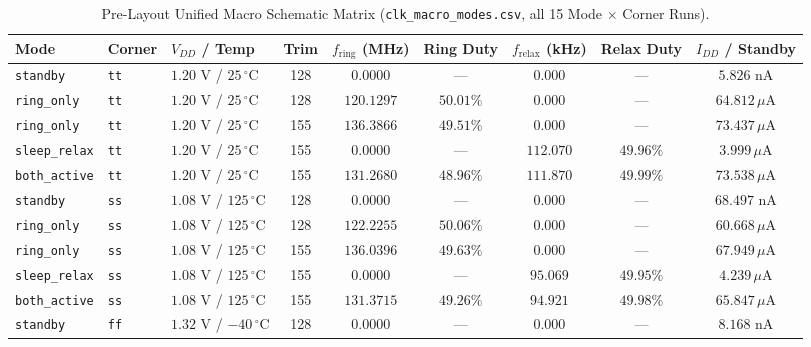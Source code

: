 \documentclass[10pt,a4paper]{article}
\begin{document}
\begin{table}[H]
\centering
\caption{Pre-Layout Unified Macro Schematic Matrix (\texttt{clk\_macro\_modes.csv}, all 15 Mode $\times$ Corner Runs).}
\label{tab:macro_modes}
\footnotesize
\setlength{\tabcolsep}{4pt}
\begin{tabular}{@{}lllcccccc@{}}
\toprule
\textbf{Mode} & \textbf{Corner} & \textbf{$V_{DD}$ / Temp} & \textbf{Trim} & \textbf{$f_{\text{ring}}$ (MHz)} & \textbf{Ring Duty} & \textbf{$f_{\text{relax}}$ (kHz)} & \textbf{Relax Duty} & \textbf{$I_{DD}$ / Standby} \\
\midrule
\texttt{standby} & \texttt{tt} & $1.20\text{ V}$ / $25\,^\circ\text{C}$ & 128 & $0.0000$ & --- & $0.000$ & --- & $5.826\text{ nA}$ \\
\texttt{ring\_only} & \texttt{tt} & $1.20\text{ V}$ / $25\,^\circ\text{C}$ & 128 & $120.1297$ & $50.01\%$ & $0.000$ & --- & $64.812\,\mu\text{A}$ \\
\texttt{ring\_only} & \texttt{tt} & $1.20\text{ V}$ / $25\,^\circ\text{C}$ & 155 & $136.3866$ & $49.51\%$ & $0.000$ & --- & $73.437\,\mu\text{A}$ \\
\texttt{sleep\_relax} & \texttt{tt} & $1.20\text{ V}$ / $25\,^\circ\text{C}$ & 155 & $0.0000$ & --- & $112.070$ & $49.96\%$ & $3.999\,\mu\text{A}$ \\
\texttt{both\_active} & \texttt{tt} & $1.20\text{ V}$ / $25\,^\circ\text{C}$ & 155 & $131.2680$ & $48.96\%$ & $111.870$ & $49.99\%$ & $73.538\,\mu\text{A}$ \\
\midrule
\texttt{standby} & \texttt{ss} & $1.08\text{ V}$ / $125\,^\circ\text{C}$ & 128 & $0.0000$ & --- & $0.000$ & --- & $68.497\text{ nA}$ \\
\texttt{ring\_only} & \texttt{ss} & $1.08\text{ V}$ / $125\,^\circ\text{C}$ & 128 & $122.2255$ & $50.06\%$ & $0.000$ & --- & $60.668\,\mu\text{A}$ \\
\texttt{ring\_only} & \texttt{ss} & $1.08\text{ V}$ / $125\,^\circ\text{C}$ & 155 & $136.0396$ & $49.63\%$ & $0.000$ & --- & $67.949\,\mu\text{A}$ \\
\texttt{sleep\_relax} & \texttt{ss} & $1.08\text{ V}$ / $125\,^\circ\text{C}$ & 155 & $0.0000$ & --- & $95.069$ & $49.95\%$ & $4.239\,\mu\text{A}$ \\
\texttt{both\_active} & \texttt{ss} & $1.08\text{ V}$ / $125\,^\circ\text{C}$ & 155 & $131.3715$ & $49.26\%$ & $94.921$ & $49.98\%$ & $65.847\,\mu\text{A}$ \\
\midrule
\texttt{standby} & \texttt{ff} & $1.32\text{ V}$ / $-40\,^\circ\text{C}$ & 128 & $0.0000$ & --- & $0.000$ & --- & $8.168\text{ nA}$ \\

\end{tabular}
\end{table}
\end{document}
